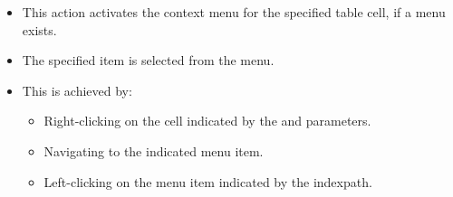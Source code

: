 \begin{itemize}
\item This action activates the context menu for the specified table cell, if a menu exists.
\item The specified item is  selected from the menu.
\item This is achieved by:
  \begin{itemize}
    \item Right-clicking on the cell indicated by the  and
   parameters.
    \item Navigating to the indicated menu item.
    \item Left-clicking on the menu item indicated by the indexpath.
  \end{itemize}
\end{itemize}

